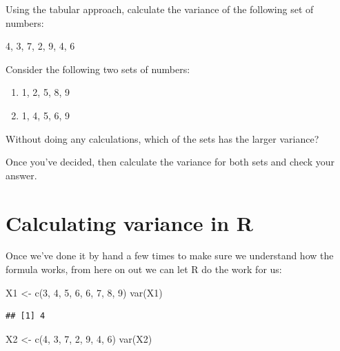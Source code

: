\documentclass[
]{book}
\newenvironment{Shaded}{\begin{snugshade}}{\end{snugshade}}
\newcommand{\DecValTok}[1]{\textcolor[rgb]{0.00,0.00,0.81}{#1}}
\newcommand{\FunctionTok}[1]{\textcolor[rgb]{0.00,0.00,0.00}{#1}}
\newcommand{\NormalTok}[1]{#1}
\newcommand{\OtherTok}[1]{\textcolor[rgb]{0.56,0.35,0.01}{#1}}
\begin{document}
Using the tabular approach, calculate the variance of the following set of numbers:

4, 3, 7, 2, 9, 4, 6

Consider the following two sets of numbers:

\begin{enumerate}
\def\labelenumi{\Alph{enumi})}
\item
  1, 2, 5, 8, 9
\item
  1, 4, 5, 6, 9
\end{enumerate}

Without doing any calculations, which of the sets has the larger variance?

Once you've decided, then calculate the variance for both sets and check your answer.

\hypertarget{variance-r}{%
\section{Calculating variance in R}\label{variance-r}}

Once we've done it by hand a few times to make sure we understand how the formula works, from here on out we can let R do the work for us:

\begin{Shaded}
\begin{Highlighting}[]
\NormalTok{X1 }\OtherTok{\textless{}{-}} \FunctionTok{c}\NormalTok{(}\DecValTok{3}\NormalTok{, }\DecValTok{4}\NormalTok{, }\DecValTok{5}\NormalTok{, }\DecValTok{6}\NormalTok{, }\DecValTok{6}\NormalTok{, }\DecValTok{7}\NormalTok{, }\DecValTok{8}\NormalTok{, }\DecValTok{9}\NormalTok{)}
\FunctionTok{var}\NormalTok{(X1)}
\end{Highlighting}
\end{Shaded}

\begin{verbatim}
## [1] 4
\end{verbatim}

\begin{Shaded}
\begin{Highlighting}[]
\NormalTok{X2 }\OtherTok{\textless{}{-}} \FunctionTok{c}\NormalTok{(}\DecValTok{4}\NormalTok{, }\DecValTok{3}\NormalTok{, }\DecValTok{7}\NormalTok{, }\DecValTok{2}\NormalTok{, }\DecValTok{9}\NormalTok{, }\DecValTok{4}\NormalTok{, }\DecValTok{6}\NormalTok{)}
\FunctionTok{var}\NormalTok{(X2)}
\end{Highlighting}
\end{Shaded}
\end{document}
